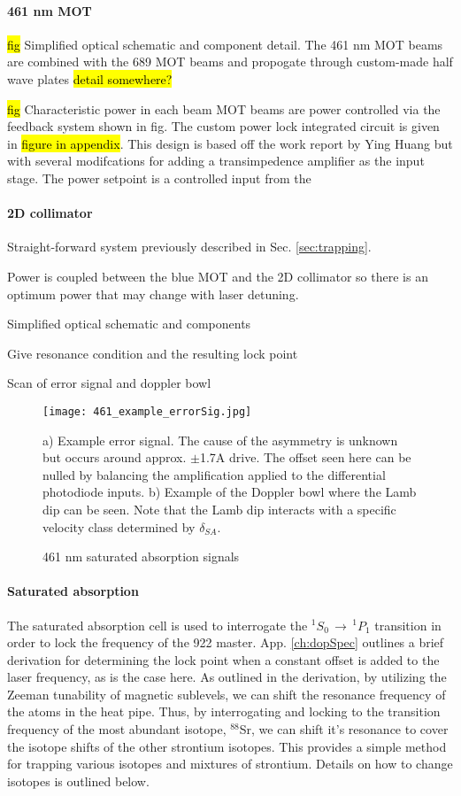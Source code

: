 \paragraph{461 nm MOT}

\hl{fig} Simplified optical schematic and component detail.
The 461 nm MOT beams are combined with the 689 MOT beams and propogate through custom-made half wave plates \hl{detail somewhere?}

\hl{fig}
Characteristic power in each beam
MOT beams are power controlled via the feedback system shown in fig.
The custom power lock integrated circuit is given in \hl{figure in appendix}.
This design is based off the work report by Ying Huang but with several modifcations for adding a transimpedence amplifier as the input stage.
The power setpoint is a controlled input from the 

\paragraph{2D collimator}
Straight-forward system previously described in Sec. \ref{sec:trapping}.

Power is coupled between the blue MOT and the 2D collimator so there is an optimum power that may change with laser detuning. 

Simplified optical schematic and components

Give resonance condition and the resulting lock point

Scan of error signal and doppler bowl
	\begin{figure}
		\centerline{
		\texttt{[image: 461\_example\_errorSig.jpg]}}
		\caption{461 nm saturated absorption signals}{a) Example error signal. The cause of the asymmetry is unknown but occurs around approx. $\pm$1.7A drive. The offset seen here can be nulled by balancing the amplification applied to the differential photodiode inputs. b) Example of the Doppler bowl where the Lamb dip can be seen. Note that the Lamb dip interacts with a specific velocity class determined by $\delta_{SA}$.}
		\label{fig:461zeemanBeam}
	\end{figure}

\paragraph{Saturated absorption}
The saturated absorption cell is used to interrogate the $^1S_0\,\rightarrow\,^1P_1$ transition in order to lock the frequency of the 922 master.
App. \ref{ch:dopSpec} outlines a brief derivation for determining the lock point when a constant offset is added to the laser frequency, as is the case here.
As outlined in the derivation, by utilizing the Zeeman tunability of magnetic sublevels, we can shift the resonance frequency of the atoms in the heat pipe.
Thus, by interrogating and locking to the transition frequency of the most abundant isotope, $^{88}$Sr, we can shift it's resonance to cover the isotope shifts of the other strontium isotopes.
This provides a simple method for trapping various isotopes and mixtures of strontium.
Details on how to change isotopes is outlined below.

